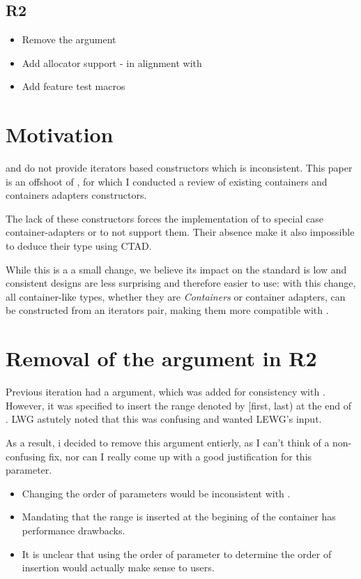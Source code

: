 \documentclass{wg21}
\begin{document}
\subsection{R2}
\begin{itemize}
    \item Remove the  argument
    \item Add allocator support - in alignment with 
    \item Add feature test macros
\end{itemize}


\section{Motivation}

 and  do not provide iterators based constructors which is inconsistent.
This paper is an offshoot of \cite{P1206}, for which I conducted a review of existing containers and containers adapters constructors.

The lack of these constructors forces the implementation of  to special case container-adapters or to not support them.
Their absence make it also impossible to deduce their type using CTAD.

While this is a a small change, we believe its impact on the standard is low and consistent designs are less surprising and therefore easier
to use: with this change, all container-like types, whether they are \emph{Containers} or container adapters, can be constructed from 
an iterators pair, making them more compatible with .


\section{Removal of the  argument in R2}

Previous iteration had a  argument, which was added for consistency
with .
However, it was specified to insert the range denoted by [first, last) at the end of .
LWG astutely noted that this was confusing and wanted LEWG's input.

As a result, i decided to remove this argument entierly, as I can't think of a non-confusing fix, 
nor can I really come up with a good justification for this parameter.

\begin{itemize}
\item Changing the order of parameters would be inconsistent with .
\item Mandating that the range is inserted at the begining of the container has performance drawbacks.
\item It is unclear that using the order of parameter to determine the order of insertion would actually make sense to users.
\end{itemize}
\end{document}

